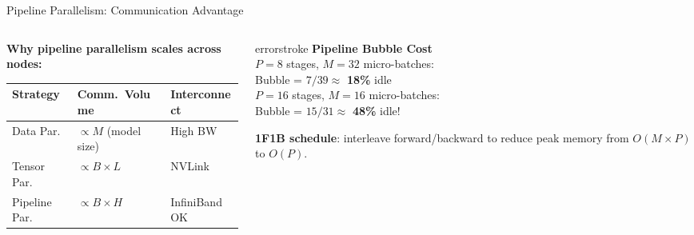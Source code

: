 \documentclass[aspectratio=169, 12pt]{beamer}
\begin{document}
\begin{frame}{Pipeline Parallelism: Communication Advantage}

\small
\begin{columns}[T]
  \begin{column}{0.55\textwidth}
    \textbf{Why pipeline parallelism scales across nodes:}

    \vspace{0.15cm}
    {\footnotesize
    \renewcommand{\arraystretch}{1.15}
    \begin{tabular}{@{}lll@{}}
      \toprule
      \textbf{Strategy} & \textbf{Comm.\ Volume} & \textbf{Interconnect} \\
      \midrule
      Data Par. & $\propto M$ (model size) & High BW \\
      Tensor Par. & $\propto B \times L$ & NVLink \\
      Pipeline Par. & $\propto B \times H$ & InfiniBand OK \\
      \bottomrule
    \end{tabular}
    }

    \vspace{0.15cm}
  \end{column}
  \begin{column}{0.42\textwidth}
    \begin{mlsyscard}{errorstroke}
    \textbf{Pipeline Bubble Cost}\\[0.1cm]
    {\footnotesize
    $P=8$ stages, $M=32$ micro-batches:\\
    Bubble = $7/39 \approx$ \textbf{18\%} idle\\[0.1cm]
    $P=16$ stages, $M=16$ micro-batches:\\
    Bubble = $15/31 \approx$ \textbf{48\%} idle!
    }
    \end{mlsyscard}

    \vspace{0.1cm}
    {\scriptsize \textbf{1F1B schedule}: interleave forward/backward to reduce peak memory from $O(M \times P)$ to $O(P)$.}
  \end{column}
\end{columns}

\end{frame}
\end{document}

